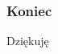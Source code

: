 \documentclass{beamer} \mode<presentation>
\newcommand{\ra}{\rightarrow}
\begin{document}




  






\begin{frame}
  \frametitle{Koniec}

  \begin{center}
    {\LARGE Dziękuję}
  \end{center}
  
\end{frame}
\end{document}
